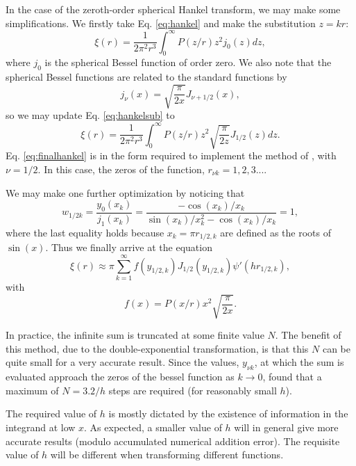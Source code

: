 \documentclass[5p]{elsarticle}
\begin{document}
In the case of the zeroth-order spherical Hankel transform, we may make some simplifications. We firstly take Eq. \ref{eq:hankel} and make the substitution $z=kr$:
\begin{equation}
	\label{eq:hankelsub}
	\xi(r) = \frac{1}{2\pi^2r^3}\int_0^\infty P(z/r)z^2j_0(z)dz,
\end{equation} 
where $j_0$ is the spherical Bessel function of order zero. We also note that the spherical Bessel functions are related to the standard functions by
\begin{equation}
	\label{eq:sphbessel}
	j_\nu(x) = \sqrt{\frac{\pi}{2x}}J_{\nu+1/2}(x),
\end{equation}
so we may update Eq. \ref{eq:hankelsub} to
\begin{equation}
	\label{eq:finalhankel}
	\xi(r) = \frac{1}{2\pi^2r^3}\int_0^\infty P(z/r) z^2\sqrt{\frac{\pi}{2z}}J_{1/2}(z)dz.
\end{equation}
Eq. \ref{eq:finalhankel} is in the form required to implement the method of \cite{Ogata2005}, with $\nu=1/2$. In this case, the zeros of the function, $r_{\nu k} = 1,2,3...$. 

We may make one further optimization by noticing that 
\begin{equation}
	\label{eq:weq1}
	w_{1/2 k} = \frac{y_0(x_k)}{j_1(x_k)} = \frac{-\cos(x_k)/x_k}{\sin(x_k)/x_k^2 - \cos(x_k)/x_k} = 1,
\end{equation}
where the last equality holds because $x_k = \pi r_{1/2,k}$ are defined as the roots of $\sin(x)$.
Thus we finally arrive at the equation
\begin{equation}
	\label{eq:hankel_final_identity}
	\xi(r) \approx \pi \sum_{k=1}^\infty f(y_{1/2, k})J_{1/2}(y_{1/2, k})\psi'(hr_{1/2, k}),
\end{equation}
with
\begin{equation}
	\label{eq:f}
	f(x) = P(x/r)x^2\sqrt{\frac{\pi}{2x}}.
\end{equation}

In practice, the infinite sum is truncated at some finite value $N$. 
The benefit of this method, due to the double-exponential transformation, is that this $N$ can be quite small for a very accurate result. 
Since the values, $y_{\nu k}$, at which the sum is evaluated approach the zeros of the bessel function as $k \rightarrow 0$, \citet{Murray2019} found that a maximum of $N=3.2/h$ steps are required (for reasonably small $h$).

 The required value of $h$ is mostly dictated by the existence of information in the integrand at low $x$. As expected, a smaller value of $h$ will in general give more accurate results (modulo accumulated numerical addition error). The requisite value of $h$ will be different when transforming 
 different functions. 
 
\end{document}
